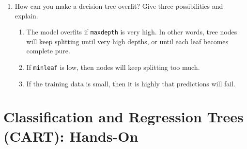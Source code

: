 \documentclass{article}
\begin{document}
\begin{enumerate}
    \item{How can you make a decision tree overfit? Give three possibilities and explain.}
    \begin{enumerate}[i]
        \item The model overfits if \texttt{max\textunderscore depth} is very high. In other words, tree nodes will keep splitting until very high depths, or until each leaf becomes complete pure. \\
        \item If \texttt{min\textunderscore leaf} is low, then nodes will keep splitting too much. \\
        \item If the training data is small, then it is highly that predictions will fail. 
    \end{enumerate}
\end{enumerate}

\newpage


\section{Classification and Regression Trees (CART): Hands-On}
\end{document}
